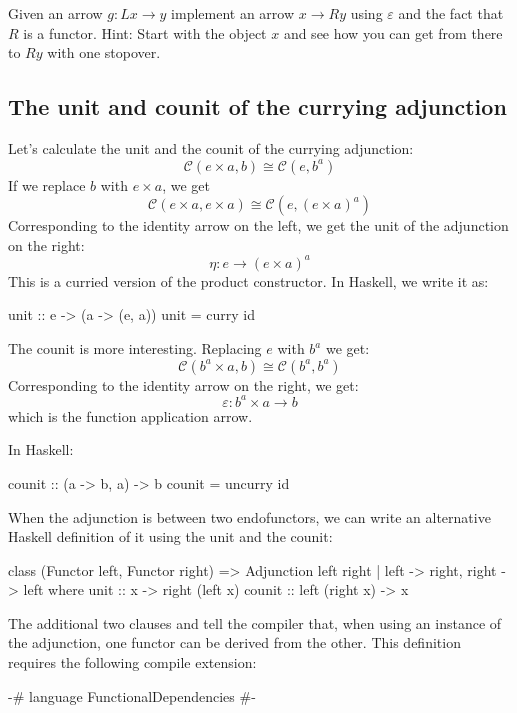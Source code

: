 \documentclass[DaoFP]{subfiles}
\begin{document}
\begin{exercise}
Given an arrow $g \colon L x \to y$ implement an arrow $x \to R y$ using $\varepsilon$ and the fact that $R$ is a functor. Hint: Start with the object $x$ and see how you can get from there to $R y$ with one stopover.
\end{exercise}

\subsection{The unit and counit of the currying adjunction}

Let's calculate the unit and the counit of the currying adjunction:
\[  \mathcal{C}(e \times a, b ) \cong  \mathcal{C} (e, b^a)  \]
If we replace $b$ with $e \times a$, we get
\[  \mathcal{C}(e \times a, e \times a ) \cong  \mathcal{C} (e, (e \times a)^a)  \]
Corresponding to the identity arrow on the left, we get the unit of the adjunction on the right:
\[ \eta \colon e \to (e \times a)^a \]
This is a curried version of the product constructor. In Haskell, we write it as:
\begin{haskell}
unit :: e -> (a -> (e, a))
unit = curry id
\end{haskell}

The counit is more interesting. Replacing $e$ with $b^a$ we get:
\[  \mathcal{C}(b^a \times a, b ) \cong  \mathcal{C} (b^a, b^a)  \]
Corresponding to the identity arrow on the right, we get:
\[ \varepsilon \colon b^a \times a \to b \]
which is the function application arrow. 

In Haskell:
\begin{haskell}
counit :: (a -> b, a) -> b
counit = uncurry id
\end{haskell}

When the adjunction is between two endofunctors, we can write an alternative Haskell definition of it using the unit and the counit:
\begin{haskell}
class (Functor left, Functor right) => 
  Adjunction left right | left -> right, right -> left where
    unit   :: x -> right (left x)
    counit :: left (right x) -> x
\end{haskell}
The additional two clauses  and  tell the compiler that, when using an instance of the adjunction, one functor can be derived from the other. This definition requires the following compile extension:
\begin{haskell}
{-# language FunctionalDependencies #-}
\end{haskell}
\end{document}
